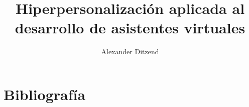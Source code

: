 \documentclass[stu,spanish,a4paper]{apa7}
\title{Hiperpersonalización aplicada al desarrollo de asistentes virtuales}
\author{Alexander Ditzend}
\affiliation{Universidad de Buenos Aires}
\begin{document}
	\tableofcontents

	
	
	
	 
	 
	 
	 
	 	
	 	
	 
	 
	 
	 
	 
	 
	 
	 
	 
	 
	 
	 
	 
	 
	 
	 
	 
	 
	 
	 
	
	
	
	
	
	
	
	
	
	

	\section{Bibliografía}
	\nocite{*}
	\printbibliography[heading=none]
\end{document}
